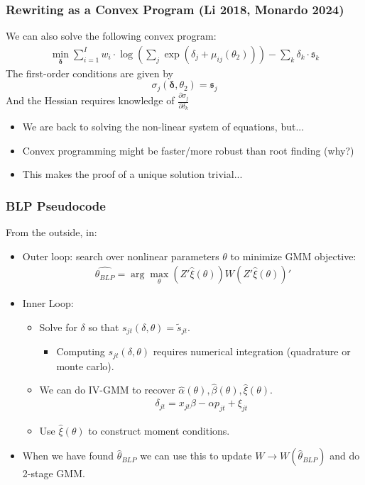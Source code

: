 \documentclass[aspectratio=169,10pt]{beamer}
\begin{document}
 \begin{frame}
\frametitle{Rewriting as a Convex Program (Li 2018, Monardo 2024)}
We can also solve the following convex program:
\begin{align*}
    \min_{\symbf{\delta}}  \sum_{i=1}^I w_i \cdot \log \left(\sum_{j} \exp\left(\delta_j  + \mu_{ij}(\theta_2) \right) \right) - \sum_k \delta_k \cdot \mathfrak{s}_{k}
\end{align*}
The first-order conditions are given by
$$\sigma_j(\symbf{\delta},\theta_2) = \mathfrak{s}_j$$
And the Hessian requires knowledge of $\frac{\partial \sigma_{j}}{\partial \delta_{k}}$
\begin{itemize}
    \item We are back to solving the non-linear system of equations, but...
    \item Convex programming might be faster/more robust than root finding (why?)
    \item This makes the proof of a unique solution trivial...
  \end{itemize}
 \end{frame}





 \begin{frame}
\frametitle{BLP Pseudocode}
\footnotesize
From the outside, in:
\begin{itemize}
\item Outer loop: search over nonlinear parameters $\theta$ to minimize GMM objective:
 \begin{align*}
 \widehat{\theta_{BLP}} = \arg \max_{\theta} (Z' \hat{\xi}(\theta)) W  (Z' \hat{\xi}(\theta))'
 \end{align*}
 \item Inner Loop:
 \begin{itemize}
\item Solve for $\delta$ so that $s_{jt}(\delta,\theta) = \tilde{s}_{jt}$.
\begin{itemize}
\item Computing $s_{jt}(\delta,\theta)$ requires numerical integration (quadrature or monte carlo).
\end{itemize}
 \item We can do IV-GMM to recover $\hat{\alpha}(\theta),\hat{\beta}(\theta),\hat{\xi}(\theta)$.
  \begin{align*}
\delta_{jt}= x_{jt} \beta -\alpha p_{jt}+  \xi_{jt}
 \end{align*}
  \item Use $\hat{\xi}(\theta)$ to construct moment conditions.
 \end{itemize}
 \item When we have found $\hat{\theta}_{BLP}$ we can use this to update $W \rightarrow W(\hat{\theta}_{BLP})$ and do 2-stage GMM.
 \end{itemize}
\end{frame}
\end{document}
